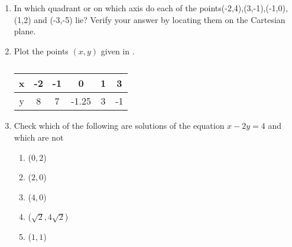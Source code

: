 \begin{enumerate}[label=\thesubsection.\arabic*,ref=\thesubsection.\theenumi]
\item In which quadrant or on which axis do each of the points(-2,4),(3,-1),(-1,0),(1,2) and (-3,-5) lie? Verify your answer by locating them on the Cartesian plane.
\item Plot the points $(x,y)$ given in 
.
\begin{table}[H]
	\centering
\begin{tabular}{|c|c|c|c|c|c|}
\hline	
x & -2 & -1 & 0 & 1 & 3\\
\hline
y & 8 & 7 & -1.25 & 3 & -1\\
\hline
\end{tabular}
\caption{}
\label{table:Table of values}
\end{table}
\item Check which of the following are solutions of the equation $x-2y=4$ and which 
are not
\begin{enumerate}
\item ($0,2$)
\item ($2,0$)
\item ($4,0$)
\item ($\sqrt 2, 4\sqrt 2$)
\item ($1,1$)
\end{enumerate}
\end{enumerate}
